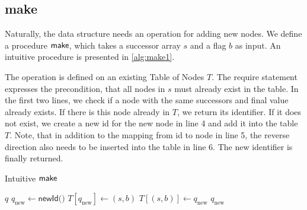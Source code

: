 \subsection{make}
Naturally, the data structure needs an operation for adding new nodes. We define a procedure $\operatorname{\textsf{make}}$, which takes a successor array $s$ and a flag $b$ as input. An intuitive procedure is presented in \autoref{alg:make1}. 
\par
The operation is defined on an existing Table of Nodes $T$.
The require statement expresses the precondition, that all nodes in $s$ must already exist in the table. In the first two lines, we check if a node with the same successors and final value already exists. If there is this node already in $T$, we return its identifier. If it does not exist, we create a new id for the new node in line 4 and add it into the table $T$. Note, that in addition to the mapping from id to node in line 5, the reverse direction also needs to be inserted into the table in line 6. The new identifier is finally returned.

\begin{algorithm}
\caption{Intuitive $\operatorname{\textsf{make}}$}\label{alg:make1}
\begin{algorithmic}[1]
\Return $q$
\Else
\State $q_{\text{new}} \gets \textsf{newId()}$
\State $T[q_{\text{new}}] \gets (s,b)$
\State $T[(s,b)] \gets q_{\text{new}}$
\Return $q_{\text{new}}$
\EndIf
\end{algorithmic}
\end{algorithm}

